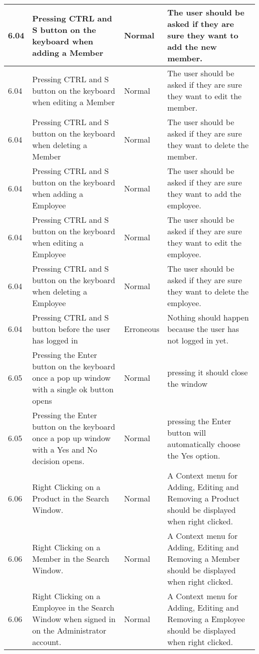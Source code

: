 \begin{flushleft}
\begin{longtable}{|p{1.5cm}|p{2.5cm}|p{2cm}|p{4.5cm}|}
	\rowcolor{light-grey}6.04 & Pressing CTRL and S button on the keyboard when adding a Member & Normal &  The user should be asked if they are sure they want to add the new member. \\ \hline
	\rowcolor{light-grey}6.04 & Pressing CTRL and S button on the keyboard when editing a Member & Normal &  The user should be asked if they are sure they want to edit the member. \\ \hline
	\rowcolor{light-grey}6.04 & Pressing CTRL and S button on the keyboard when deleting a Member & Normal &  The user should be asked if they are sure they want to delete the member. \\ \hline
	\rowcolor{light-grey}6.04 & Pressing CTRL and S button on the keyboard when adding a Employee& Normal & The user should be asked if they are sure they want to add the employee. \\ \hline
	\rowcolor{light-grey}6.04 & Pressing CTRL and S button on the keyboard when editing a Employee& Normal & The user should be asked if they are sure they want to edit the employee. \\ \hline
	\rowcolor{light-grey}6.04 & Pressing CTRL and S button on the keyboard when deleting a Employee& Normal & The user should be asked if they are sure they want to delete the employee. \\ \hline
	\rowcolor{light-grey}6.04 & Pressing CTRL and S button before the user has logged in & Erroneous & Nothing should happen because the user has not logged in yet. \\ \hline
	\rowcolor{light-grey}6.05 &  Pressing the Enter button on the keyboard once a pop up window with a single ok button opens & Normal & pressing it should close the window\\ \hline
	\rowcolor{light-grey}6.05 &  Pressing the Enter button on the keyboard once a pop up window with a Yes and No decision opens. & Normal & pressing the Enter button will automatically choose the Yes option. \\ \hline
	\rowcolor{light-grey}6.06 & Right Clicking on a Product in the Search Window. & Normal & A Context menu for Adding, Editing and Removing a Product should be displayed when right clicked.\\ \hline
	\rowcolor{light-grey}6.06 & Right Clicking on a Member in the Search Window. & Normal & A Context menu for Adding, Editing and Removing a Member should be displayed when right clicked.\\ \hline
	\rowcolor{light-grey}6.06 & Right Clicking on a Employee in the Search Window when signed in on the Administrator account. & Normal & A Context menu for Adding, Editing and Removing a Employee should be displayed when right clicked.\\ \hline

\end{longtable}
\end{flushleft}

